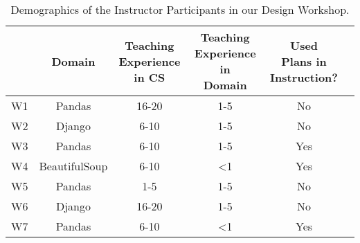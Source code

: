\begin{table}
\caption{Demographics of the Instructor Participants in our Design Workshop.}
    \centering
    \footnotesize
    \label{tab:participants-design-workshop}
    \begin{tabular}{l|ccccc}
    \toprule
            & Domain & \shortstack{Teaching \\ Experience \\ in CS} & \shortstack{Teaching \\ Experience in \\ Domain} & \shortstack{Used \\ Plans in \\ Instruction?}
    \\\midrule
        W1 & Pandas & 16-20 & 1-5 & No \\
        W2 & Django & 6-10 & 1-5 & No \\
        W3 & Pandas & 6-10 & 1-5 & Yes \\
        W4 & BeautifulSoup & 6-10 & <1 & Yes \\
        W5 & Pandas & 1-5 & 1-5 & No \\
        W6 & Django & 16-20 & 1-5 & No \\
        W7 & Pandas & 6-10 & <1 & Yes \\
    \end{tabular}%
\end{table}


